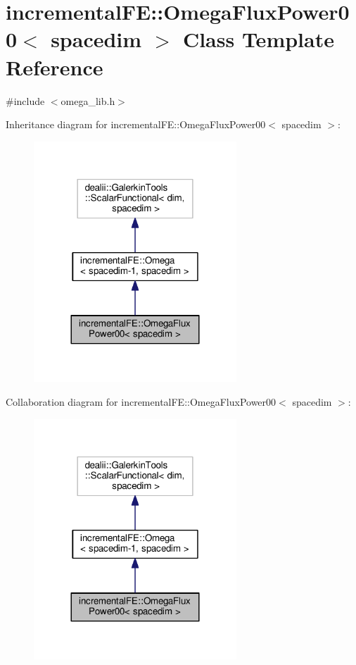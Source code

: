 \hypertarget{classincremental_f_e_1_1_omega_flux_power00}{}\section{incremental\+FE\+:\+:Omega\+Flux\+Power00$<$ spacedim $>$ Class Template Reference}
\label{classincremental_f_e_1_1_omega_flux_power00}


{\ttfamily \#include $<$omega\+\_\+lib.\+h$>$}



Inheritance diagram for incremental\+FE\+:\+:Omega\+Flux\+Power00$<$ spacedim $>$\+:\nopagebreak
\begin{figure}[H]
\begin{center}
\leavevmode
\includegraphics[width=216pt]{classincremental_f_e_1_1_omega_flux_power00__inherit__graph}
\end{center}
\end{figure}


Collaboration diagram for incremental\+FE\+:\+:Omega\+Flux\+Power00$<$ spacedim $>$\+:\nopagebreak
\begin{figure}[H]
\begin{center}
\leavevmode
\includegraphics[width=216pt]{classincremental_f_e_1_1_omega_flux_power00__coll__graph}
\end{center}
\end{figure}
